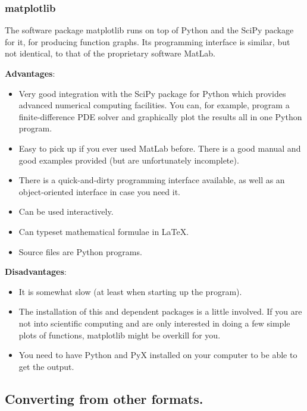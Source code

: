 \subsubsection*{matplotlib}

The software package matplotlib runs on top of Python and the SciPy package for it, for producing function graphs. Its programming interface is similar, but not identical, to that of the proprietary software MatLab.

\textbf{Advantages}:
\begin{itemize}
\item
Very good integration with the SciPy package for Python which provides advanced numerical computing facilities. You can, for example, program a finite-difference PDE solver and graphically plot the results all in one Python program.
\item
Easy to pick up if you ever used MatLab before. There is a good manual and good examples provided (but are unfortunately incomplete).
\item
There is a quick-and-dirty programming interface available, as well as an object-oriented interface in case you need it.
\item
Can be used interactively.
\item
Can typeset mathematical formulae in LaTeX.
\item
Source files are Python programs.
\end{itemize}

\textbf{Disadvantages}:
\begin{itemize}
\item
It is somewhat slow (at least when starting up the program).
\item
The installation of this and dependent packages is a little involved. If you are not into scientific computing and are only interested in doing a few simple plots of functions, matplotlib might be overkill for you.
\item
You need to have Python and PyX installed on your computer to be able to get the output.
\end{itemize}

\subsection*{Converting from other formats.} \label{gfxformats}



